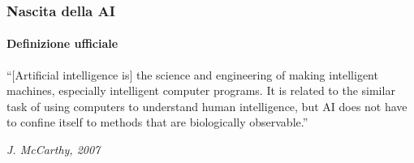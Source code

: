 \begin{frame}[t] \frametitle{Nascita della AI}
{\scriptsize
	\onslide<1->
		\framesubtitle{Definizione ufficiale}
		\vspace*{.3cm}
        \centering
		\begin{minipage}[t]{.75\textwidth}
			\renewcommand{\epigraphsize}{\small}
			\setlength{\afterepigraphskip}{0pt}
			\setlength{\beforeepigraphskip}{5pt}
			\setlength{\epigraphwidth}{0.9\textwidth}
			\epigraph{``[Artificial intelligence is] the science and engineering of making
intelligent machines, especially intelligent computer programs. It is
related to the similar task of using computers to understand human
intelligence, but AI does not have to confine itself to methods that are
biologically observable.''}{\textit{J. McCarthy, 2007}}
		\end{minipage}%
}
\end{frame}

